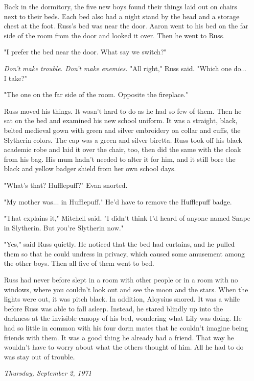 \documentclass[a4paper,11pt]{article}
\begin{document}
Back in the dormitory, the five new boys found their things laid out on chairs next to their beds. Each bed also had a night stand by the head and a storage chest at the foot. Russ's bed was near the door. Aaron went to his bed on the far side of the room from the door and looked it over. Then he went to Russ.

"I prefer the bed near the door. What say we switch?"

\emph{Don't make trouble. Don't make enemies.} "All right," Russ said. "Which one do... I take?"

"The one on the far side of the room. Opposite the fireplace."

Russ moved his things. It wasn't hard to do as he had so few of them. Then he sat on the bed and examined his new school uniform. It was a straight, black, belted medieval gown with green and silver embroidery on collar and cuffs, the Slytherin colors. The cap was a green and silver biretta. Russ took off his black academic robe and laid it over the chair, too, then did the same with the cloak from his bag. His mum hadn't needed to alter it for him, and it still bore the black and yellow badger shield from her own school days.

"What's that? Hufflepuff?" Evan snorted.

"My mother was... in Hufflepuff." He'd have to remove the Hufflepuff badge.

"That explains it," Mitchell said. "I didn't think I'd heard of anyone named Snape in Slytherin. But you're Slytherin now."

"Yes," said Russ quietly. He noticed that the bed had curtains, and he pulled them so that he could undress in privacy, which caused some amusement among the other boys. Then all five of them went to bed.

Russ had never before slept in a room with other people or in a room with no windows, where you couldn't look out and see the moon and the stars. When the lights were out, it was pitch black. In addition, Aloysius snored. It was a while before Russ was able to fall asleep. Instead, he stared blindly up into the darkness at the invisible canopy of his bed, wondering what Lily was doing. He had so little in common with his four dorm mates that he couldn't imagine being friends with them. It was a good thing he already had a friend. That way he wouldn't have to worry about what the others thought of him. All he had to do was stay out of trouble.

\emph{Thursday, September 2, 1971}
\end{document}
